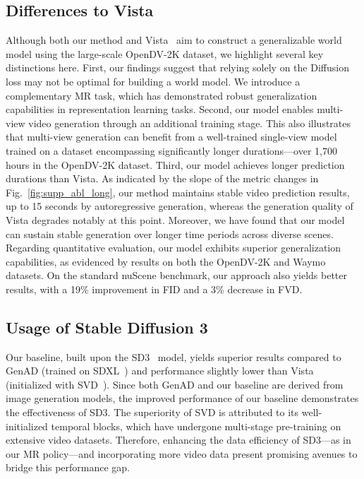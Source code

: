 \subsection{Differences to Vista}
Although both our method and Vista~\cite{vista} aim to construct a generalizable world model using the large-scale OpenDV-2K dataset, we highlight several key distinctions here. First, our findings suggest that relying solely on the Diffusion loss may not be optimal for building a world model. We introduce a complementary MR task, which has demonstrated robust generalization capabilities in representation learning tasks. Second, our model enables multi-view video generation through an additional training stage. This also illustrates that multi-view generation can benefit from a well-trained single-view model trained on a dataset encompassing significantly longer durations—over 1,700 hours in the OpenDV-2K dataset. Third, our model achieves longer prediction durations than Vista. As indicated by the slope of the metric changes in Fig.~\ref{fig:supp_abl_long}, our method maintains stable video prediction results, up to 15 seconds by autoregressive generation, whereas the generation quality of Vista degrades notably at this point. Moreover, we have found that our model can sustain stable generation over longer time periods across diverse scenes. Regarding quantitative evaluation, our model exhibits superior generalization capabilities, as evidenced by results on both the OpenDV-2K and Waymo datasets. On the standard nuScene benchmark, our approach also yields better results, with a 19\% improvement in FID and a 3\% decrease in FVD.


\subsection{Usage of Stable Diffusion 3}
Our baseline, built upon the SD3~\cite{sd3} model, yields superior results compared to GenAD (trained on SDXL~\cite{podell2023sdxl}) and performance slightly lower than Vista (initialized with SVD~\cite{svd}). Since both GenAD and our baseline are derived from image generation models, the improved performance of our baseline demonstrates the effectiveness of SD3. The superiority of SVD is attributed to its well-initialized temporal blocks, which have undergone multi-stage pre-training on extensive video datasets. Therefore, enhancing the data efficiency of SD3—as in our MR policy—and incorporating more video data present promising avenues to bridge this performance gap.

